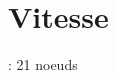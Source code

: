\hypertarget{_vitesse-example}{}\section{Vitesse}
\+: 21 noeuds


\begin{DoxyCodeInclude}
\end{DoxyCodeInclude}
 